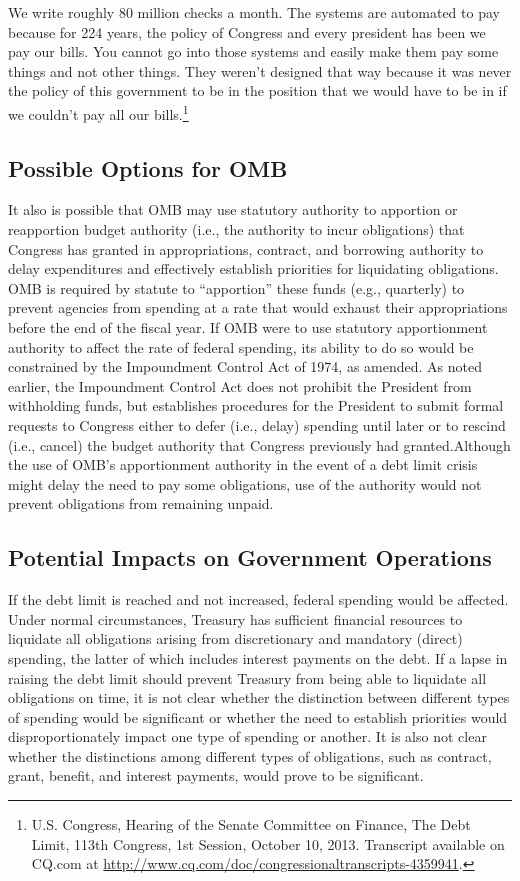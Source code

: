 \begin{displayquote}
We write roughly 80 million checks a month. The systems are automated to pay because for 224 years, the policy of Congress and every president has been we pay our bills. You cannot go into those systems and easily make them pay some things and not other things. They weren't designed that way because it was never the policy of this government to be in the position that we would have to be in if we couldn't pay all our bills.\footnote{U.S. Congress, Hearing of the Senate Committee on Finance, The Debt Limit, 113th Congress, 1st Session, October 10, 2013. Transcript available on CQ.com at \url{http://www.cq.com/doc/congressionaltranscripts-4359941}.}
\end{displayquote}

\subsection{Possible Options for OMB}
It also is possible that OMB may use statutory authority to apportion or reapportion budget authority (i.e., the authority to incur obligations) that Congress has granted in appropriations, contract, and borrowing authority to delay expenditures and effectively establish priorities for liquidating obligations. OMB is required by statute to “apportion” these funds (e.g., quarterly) to prevent agencies from spending at a rate that would exhaust their appropriations before the end of the fiscal year. If OMB were to use statutory apportionment authority to affect the rate of federal spending, its ability to do so would be constrained by the Impoundment Control Act of 1974, as amended. As noted earlier, the Impoundment Control Act does not prohibit the President from withholding funds, but establishes procedures for the President to submit formal requests to Congress either to defer (i.e., delay) spending until later or to rescind (i.e., cancel) the budget authority that Congress previously had granted.Although the use of OMB’s apportionment authority in the event of a debt limit crisis might delay the need to pay some obligations, use of the authority would not prevent obligations from remaining unpaid.

\subsection{Potential Impacts on Government Operations}
If the debt limit is reached and not increased, federal spending would be affected. Under normal circumstances, Treasury has sufficient financial resources to liquidate all obligations arising from discretionary and mandatory (direct) spending, the latter of which includes interest payments on the debt. If a lapse in raising the debt limit should prevent Treasury from being able to liquidate all obligations on time, it is not clear whether the distinction between different types of spending would be significant or whether the need to establish priorities would disproportionately impact one type of spending or another. It is also not clear whether the distinctions among different types of obligations, such as contract, grant, benefit, and interest payments, would prove to be significant.

